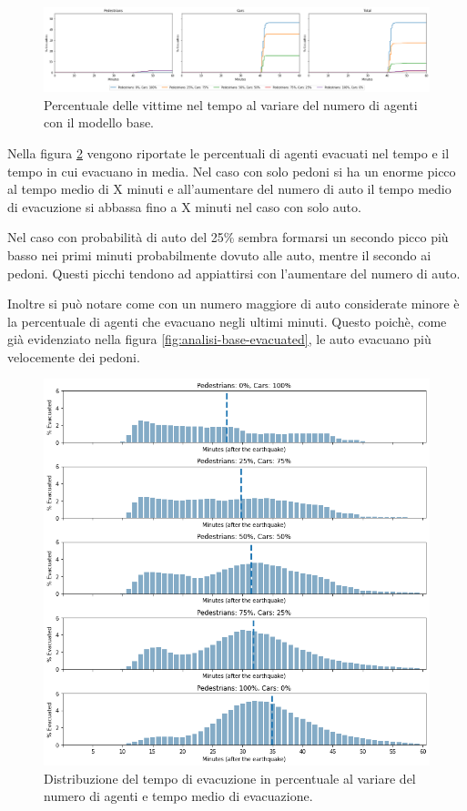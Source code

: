 \begin{figure}[ht]
    \centering
    \includegraphics[width=\textwidth]{images/analisi/base-casualties.png}
    \caption{
        Percentuale delle vittime nel tempo al variare del numero di agenti con il modello base.
    }
    \label{fig:analisi-base-casualties}
\end{figure}

Nella figura \ref{fig:analisi-base-evtimes} vengono riportate le percentuali di agenti evacuati nel tempo e il tempo in cui evacuano in media.
%
Nel caso con solo pedoni si ha un enorme picco al tempo medio di X minuti e all'aumentare del numero di auto
il tempo medio di evacuzione si abbassa fino a X minuti nel caso con solo auto.

Nel caso con probabilità di auto del 25\% sembra formarsi un secondo picco più basso nei primi minuti probabilmente dovuto alle auto, mentre il secondo ai pedoni.
Questi picchi tendono ad appiattirsi con l'aumentare del numero di auto.

Inoltre si può notare come con un numero maggiore di auto considerate minore è la percentuale di agenti che evacuano negli ultimi minuti.
Questo poichè, come già evidenziato nella figura \ref{fig:analisi-base-evacuated}, le auto evacuano più velocemente dei pedoni.

\begin{figure}
    \centering
    \includegraphics[width=\textwidth]{images/analisi/base-evtimes.png}
    \caption{
        Distribuzione del tempo di evacuzione in percentuale al variare del numero di agenti e tempo medio di evacuazione.
    }
    \label{fig:analisi-base-evtimes}
\end{figure}

